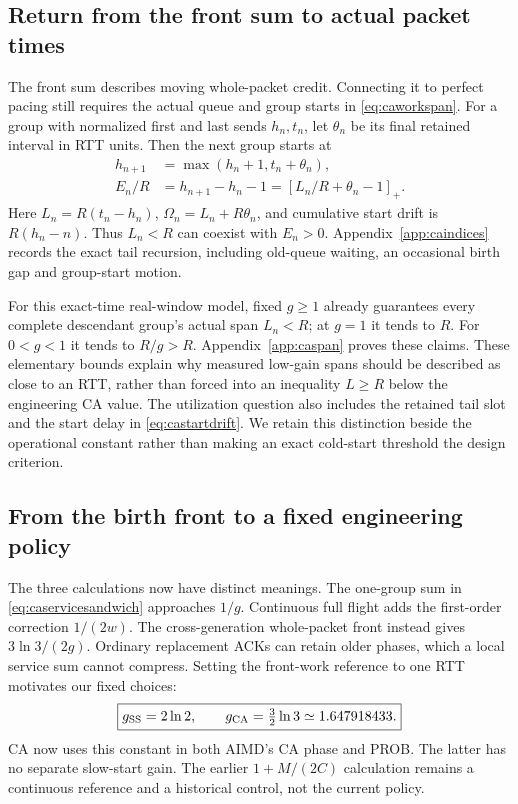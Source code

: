 \documentclass[sigconf,nonacm]{acmart}
\begin{document}
\subsection{Return from the front sum to actual packet times}\label{sec:caspandrift}
The front sum describes moving whole-packet credit. Connecting it to
perfect pacing still requires the actual queue and group starts in
\eqref{eq:caworkspan}. For a group with normalized first and last sends
$h_n,t_n$, let $\theta_n$ be its final retained interval in RTT units.
Then the next group starts at
\begin{equation}\begin{aligned}
 h_{n+1}&=\max(h_n+1,t_n+\theta_n),\\
 E_n/R&=h_{n+1}-h_n-1
       =[L_n/R+\theta_n-1]_+.
\end{aligned}\label{eq:castartdrift}\end{equation}
Here $L_n=R(t_n-h_n)$, $\Omega_n=L_n+R\theta_n$, and cumulative start
drift is $R(h_n-n)$. Thus $L_n<R$ can coexist with $E_n>0$.
Appendix~\ref{app:caindices} records the exact tail recursion, including
old-queue waiting, an occasional birth gap and group-start motion.

For this exact-time real-window model, fixed $g\ge1$ already guarantees
every complete descendant group's actual span $L_n<R$; at $g=1$ it tends
to $R$. For $0<g<1$ it tends to $R/g>R$. Appendix~\ref{app:caspan}
proves these claims. These elementary bounds explain why measured low-gain spans should be
described as close to an RTT, rather than forced into an inequality
$L\ge R$ below the engineering CA value. The utilization question also
includes the retained tail slot and the start delay in
\eqref{eq:castartdrift}. We retain this distinction beside the operational
constant rather than making an exact cold-start threshold the design
criterion.

\subsection{From the birth front to a fixed engineering policy}
The three calculations now have distinct meanings. The one-group sum
in \eqref{eq:caservicesandwich} approaches $1/g$. Continuous full flight
adds the first-order correction $1/(2w)$. The cross-generation
whole-packet front instead gives $3\ln3/(2g)$. Ordinary replacement ACKs
can retain older phases, which a local service sum cannot compress.
Setting the front-work reference to one RTT motivates our fixed choices:
\begin{equation}
 \boxed{g_{\rm SS}=2\ln2,\qquad
 g_{\rm CA}=\tfrac32\ln3\simeq1.647918433.}\label{eq:engineeringgain}
\end{equation}
CA now uses this constant in both AIMD's CA phase and PROB. The latter
has no separate slow-start gain. The earlier $1+M/(2C)$ calculation remains
a continuous reference and a historical control, not the current policy.
\end{document}
